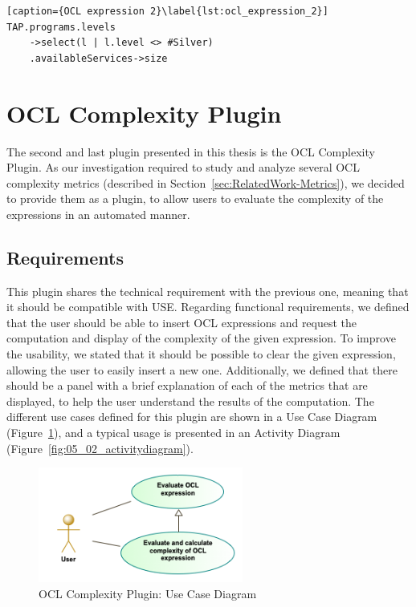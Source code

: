 \begin{lstlisting}[caption={OCL expression 2}\label{lst:ocl_expression_2}]
TAP.programs.levels
    ->select(l | l.level <> #Silver)
    .availableServices->size
\end{lstlisting}

\section{OCL Complexity Plugin}
\label{chap:Implementation-OCLComplexityPlugin}

The second and last plugin presented in this thesis is the OCL Complexity Plugin. As our investigation required to study and analyze several OCL complexity metrics (described in Section~\ref{sec:RelatedWork-Metrics}), we decided to provide them as a plugin, to allow users to evaluate the complexity of the expressions in an automated manner. 

\subsection{Requirements}

This plugin shares the technical requirement with the previous one, meaning that it should be compatible with USE. Regarding functional requirements, we defined that the user should be able to insert OCL expressions and request the computation and display of the complexity of the given expression. To improve the usability, we stated that it should be possible to clear the given expression, allowing the user to easily insert a new one. Additionally, we defined that there should be a panel with a brief explanation of each of the metrics that are displayed, to help the user understand the results of the computation. The different use cases defined for this plugin are shown in a Use Case Diagram (Figure~\ref{fig:05_02_usecasediagram}), and a typical usage is presented in an Activity Diagram (Figure~\ref{fig:05_02_activitydiagram}).

\begin{figure}[ht]
    \centering
    \includegraphics[width=0.6\textwidth]{Chapters/figures/5_Implementation/02_UseCaseDiagram}
    \caption{OCL Complexity Plugin: Use Case Diagram}
    \label{fig:05_02_usecasediagram}
\end{figure}
  
